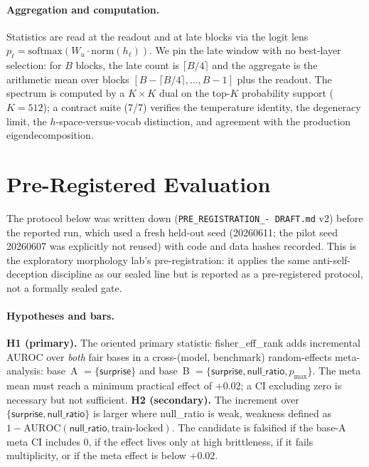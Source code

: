 \documentclass[10pt, letterpaper]{article}
\newcommand{\auroc}{\text{AUROC}}
\newcommand{\Wu}{W_{u}}
\newcommand{\pmax}{p_{\max}}
\newcommand{\effrank}{\textsf{fisher\_eff\_rank}}
\newcommand{\nullr}{\textsf{null\_ratio}}
\begin{document}
\paragraph{Aggregation and computation.}
Statistics are read at the readout and at late blocks via the logit
lens $p_\ell=\mathrm{softmax}(\Wu\cdot\mathrm{norm}(h_\ell))$. We pin
the late window with no best-layer selection: for $B$ blocks, the late
count is $\lceil B/4\rceil$ and the aggregate is the arithmetic mean
over blocks $[B-\lceil B/4\rceil,\dots,B-1]$ plus the readout. The
spectrum is computed by a $K{\times}K$ dual on the top-$K$ probability
support ($K{=}512$); a contract suite (7/7) verifies the temperature
identity, the degeneracy limit, the $h$-space-versus-vocab distinction,
and agreement with the production eigendecomposition.

\section{Pre-Registered Evaluation}
\label{sec:eval}

The protocol below was written down (\texttt{PRE\_REGISTRATION\_-
DRAFT.md} v2) before the reported run, which used a fresh held-out seed
(20260611; the pilot seed 20260607 was explicitly not reused) with code
and data hashes recorded. This is the exploratory morphology lab's
pre-registration: it applies the same anti-self-deception discipline as
our sealed line \citep{nosek2018preregistration,
pineau2021reproducibility} but is reported as a pre-registered protocol,
not a formally sealed gate.

\paragraph{Hypotheses and bars.}
\textbf{H1 (primary).} The oriented primary statistic \effrank{} adds
incremental AUROC over \emph{both} fair bases in a
cross-(model, benchmark) random-effects meta-analysis: base~A
$=\{\textsf{surprise}\}$ and base~B
$=\{\textsf{surprise},\nullr{},\pmax\}$. The meta mean must reach a
minimum practical effect of $+0.02$; a CI excluding zero is necessary
but not sufficient. \textbf{H2 (secondary).} The increment over
$\{\textsf{surprise},\nullr{}\}$ is larger where \nullr{} is weak,
weakness defined as $1-\auroc(\nullr{},\text{train-locked})$. The
candidate is falsified if the base-A meta CI includes 0, if the effect
lives only at high brittleness, if it fails multiplicity, or if the
meta effect is below $+0.02$.
\end{document}
